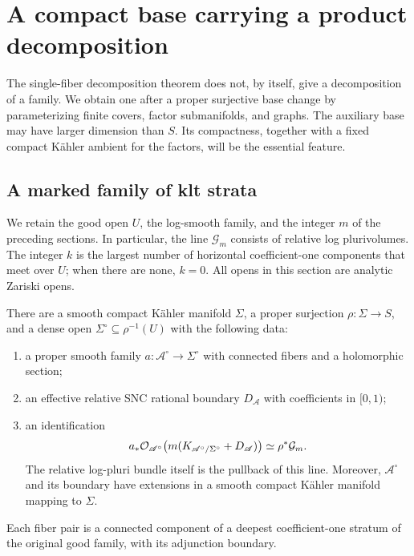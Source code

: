 \section{A compact base carrying a product decomposition}\label{sec:spreading}

The single-fiber decomposition theorem does not, by itself, give a
decomposition of a family.  We obtain one after a proper surjective base
change by parameterizing finite covers, factor submanifolds, and graphs.
The auxiliary base may have larger dimension than \(S\).  Its compactness,
together with a fixed compact K\"ahler ambient for the factors, will be
the essential feature.

\subsection{A marked family of klt strata}

We retain the good open \(U\), the log-smooth family, and the integer \(m\)
of the preceding sections.  In particular, the line
\(\mathcal G_m\) consists of relative log plurivolumes.  The integer \(k\)
is the largest number of horizontal coefficient-one components that meet
over \(U\); when there are none, \(k=0\).
All opens in this section are analytic Zariski opens.

\begin{lemma}\label{spread:marked}
There are a smooth compact K\"ahler manifold \(\Sigma\), a proper
surjection \(\rho:\Sigma\to S\), and a dense open
\(\Sigma^\circ\subseteq\rho^{-1}(U)\) with the following data:
\begin{enumerate}[label=\textup{(\roman*)}]
\item a proper smooth family
\(a:\mathscr A^\circ\to\Sigma^\circ\) with connected fibers and a
holomorphic section;
\item an effective relative SNC rational boundary \(D_{\mathscr A}\)
with coefficients in \([0,1)\);
\item an identification
\[
 a_*\mathcal O_{\mathscr A^\circ}
       \bigl(m(K_{\mathscr A^\circ/\Sigma^\circ}+D_{\mathscr A})\bigr)
 \simeq \rho^*\mathcal G_m.
\]
The relative log-pluri bundle itself is the pullback of this line.
Moreover, \(\mathscr A^\circ\) and its boundary have extensions in a
smooth compact K\"ahler manifold mapping to \(\Sigma\).
\end{enumerate}
Each fiber pair is a connected component of a deepest coefficient-one
stratum of the original good family, with its adjunction boundary.
\end{lemma}

